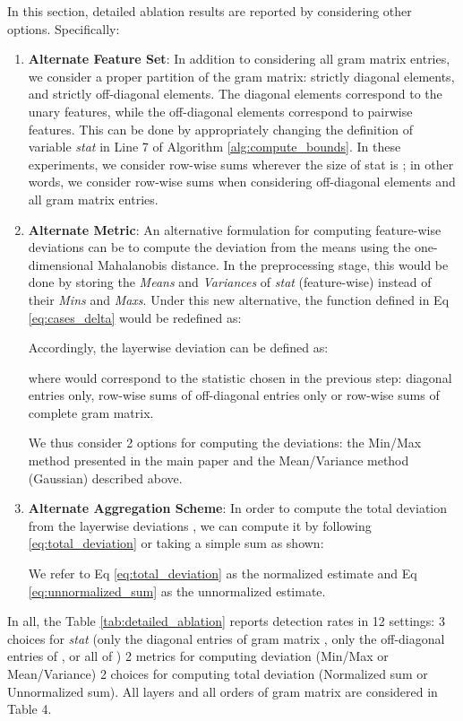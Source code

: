 \documentclass{article}
\begin{document}
In this section, detailed ablation results are reported by considering other options. Specifically:
\begin{enumerate}
    \item \textbf{Alternate Feature Set}: In addition to considering all gram matrix entries, we consider a proper partition of the gram matrix: strictly diagonal elements, and strictly off-diagonal elements. The diagonal elements correspond to the unary features, while the off-diagonal elements correspond to pairwise features. This can be done by appropriately changing the definition of variable \textit{stat} in Line 7 of Algorithm \ref{alg:compute_bounds}. In these experiments, we consider row-wise sums wherever the size of stat is ; in other words, we consider row-wise sums when considering off-diagonal elements and all gram matrix entries.
    \item \textbf{Alternate Metric}: An alternative formulation for computing feature-wise deviations can be to compute the deviation from the means using the one-dimensional Mahalanobis distance. In the preprocessing stage, this would be done by storing the \textit{Means} and \textit{Variances} of \textit{stat} (feature-wise) instead of their \textit{Mins} and \textit{Maxs}. Under this new alternative, the function  defined in Eq \ref{eq:cases_delta} would be redefined as:
    
    Accordingly, the layerwise deviation  can be defined as:
    
    where  would correspond to the statistic chosen in the previous step: diagonal entries only, row-wise sums of off-diagonal entries only or row-wise sums of complete gram matrix.

    We thus consider 2 options for computing the deviations: the Min/Max method presented in the main paper and the Mean/Variance method (Gaussian) described above.
    \item \textbf{Alternate Aggregation Scheme}: In order to compute the total deviation  from the layerwise deviations , we can compute it by following \ref{eq:total_deviation} or taking a simple sum as shown:
    
    We refer to Eq \ref{eq:total_deviation} as the normalized estimate and Eq \ref{eq:unnormalized_sum} as the unnormalized estimate.
\end{enumerate}

In all, the Table \ref{tab:detailed_ablation} reports detection rates in 12 settings: 3 choices for \textit{stat} (only the diagonal entries of gram matrix , only the off-diagonal entries of , or all of )  2 metrics for computing deviation (Min/Max or Mean/Variance)  2 choices for computing total deviation (Normalized sum or Unnormalized sum). All layers and all orders of gram matrix are considered in Table 4.
\end{document}
